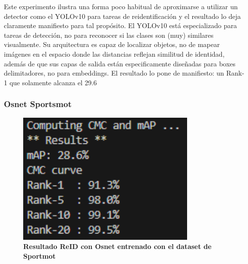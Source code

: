 \documentclass[12pt, a4paper, twoside]{article}
\begin{document}
 	Este experimento ilustra una forma poco habitual de aproximarse a utilizar un detector como el YOLOv10 para tareas de reidentificación y el resultado lo deja claramente manifiesto para tal propósito.
 	El YOLOv10 está especializado para tareas de detección, no para reconocer si las clases son (muy) similares visualmente. Su arquitectura es capaz de localizar objetos, no de mapear imágenes en el espacio donde las distancias reflejan similitud de identidad, además de que sus capas de salida están especificamente diseñadas para boxes delimitadores, no para embeddings.
 	El resultado lo pone de manifiesto: un Rank-1 que solamente alcanza el 29.6%
 	
 	
 	\subsubsection{Osnet Sportsmot}
 	
 	\begin{figure}[H]
 		\centering
 		\includegraphics[width=0.8\textwidth]{image/sports_model.pth.tar-60_sportsmot}
 		\caption{\textbf{Resultado ReID con Osnet entrenado con el dataset de Sportmot}}
 		\label{fig:Resultado DeepEIoU con Osnet reid sportsmot osnet_x1_0}
 	\end{figure}
 	
\end{document}
